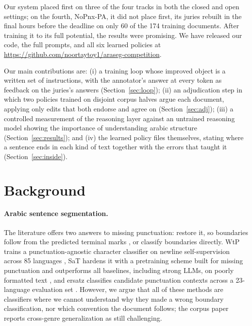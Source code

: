 \documentclass[11pt]{article}
\begin{document}
Our system placed first on three of the four tracks in both the closed and open
settings; on the fourth, NoPnx-PA, it did not place first, its juries rebuilt in the
final hours before the deadline on only 60 of the 174 training documents. After training it to its full potential, the results were promising. We have released our code, the full prompts, and all six learned policies
at \url{https://github.com/noortaytoy1/araseg-competition}.

Our main contributions are: (i) a training loop whose improved object is a written
set of instructions, with the annotator's answer at every token as feedback on the juries's answers
(Section~\ref{sec:loop}); (ii) an adjudication step in which two policies trained on
disjoint corpus halves argue each document, applying only edits that both endorse and agree on
(Section~\ref{sec:adj}); (iii) a controlled measurement of the reasoning layer
against an untrained reasoning model showing the importance of understanding arabic structure
(Section~\ref{sec:results}); and (iv) the learned policy files themselves, stating
where a sentence ends in each kind of text together with the errors that taught it
(Section~\ref{sec:inside}).
\section{Background}
\paragraph{Arabic sentence segmentation.} The literature offers two answers to
missing punctuation: restore it, so boundaries follow from the predicted terminal
marks \citep{tilk2016bidirectional}, or classify boundaries directly. WtP trains a
punctuation-agnostic character classifier on newline self-supervision across 85
languages \citep{minixhofer2023wheres}, SaT hardens it with a pretraining scheme
built for missing punctuation and outperforms all baselines, including strong LLMs, on
poorly formatted text \citep{frohmann2024segment}, and ersatz classifies candidate
punctuation contexts across a 23-language evaluation set \citep{wicks2021unified}. However, we argue that all of these methods are classifiers where we cannot understand why they made a wrong boundary classification,
nor which convention the document follows; the corpus paper reports cross-genre
generalization as still challenging.
\end{document}

